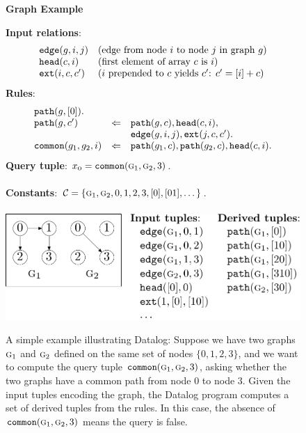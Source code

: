 \begin{figure}
\begin{center} {\bf Graph Example} \end{center}
{\bf Input relations}:
\[
\begin{array}{ll}
\text{\tt edge}(g,i,j) & \text{(edge from node $i$ to node $j$ in graph $g$)} \\
\text{\tt head}(c,i)   & \text{(first element of array $c$ is $i$)} \\
\text{\tt ext}(i,c,c') & \text{($i$ prepended to $c$ yields $c'$: $c' = [i]+c$)} \\
\end{array}
\]
{\bf Rules}:
\[
\begin{array}{lcl}
\text{\tt path}(g,[0]). & \\
\text{\tt path}(g,c')           &\Leftarrow& \text{\tt path}(g,c), \text{\tt head}(c,i), \\
                      &           & \text{\tt edge}(g, i, j), \text{\tt ext}(j, c, c'). \\
\text{\tt common}(g_1,g_2,i)    &\Leftarrow& \text{\tt path}(g_1,c), \text{\tt path}(g_2,c), \text{\tt head}(c,i). \\
\end{array}
\]
{\bf Query tuple}: $x_\text{\sc o} = \text{\tt common}(\text{\sc g}_1,\text{\sc g}_2,3)$. \\
\\
{\bf Constants}: $\mathcal{C} = \{ \text{\sc g}_1, \text{\sc g}_2, 0, 1, 2, 3, [0], [01], \dots \}$.
\\
\\
\includegraphics[scale=0.5]{figures/graphExample}
\caption{\label{fig:graphExample}
A simple example illustrating Datalog:
Suppose we have two graphs $\text{\sc g}_1$ and $\text{\sc g}_2$ defined on the same set of nodes $\{0,1,2,3\}$,
and we want to compute the query tuple $\text{\tt common}(\text{\sc g}_1,\text{\sc g}_2,3)$,
asking whether the two graphs have a common path from node $0$ to node $3$.
Given the input tuples encoding the graph,
the Datalog program computes a set of derived tuples from the rules.
In this case, the absence of $\text{\tt common}(\text{\sc g}_1,\text{\sc g}_2,3)$ means the query is false.
}
\end{figure}

